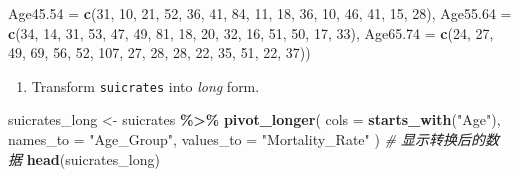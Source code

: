 \documentclass[
]{article}
\newenvironment{Shaded}{\begin{snugshade}}{\end{snugshade}}
\newcommand{\AttributeTok}[1]{\textcolor[rgb]{0.13,0.29,0.53}{#1}}
\newcommand{\CommentTok}[1]{\textcolor[rgb]{0.56,0.35,0.01}{\textit{#1}}}
\newcommand{\DecValTok}[1]{\textcolor[rgb]{0.00,0.00,0.81}{#1}}
\newcommand{\FunctionTok}[1]{\textcolor[rgb]{0.13,0.29,0.53}{\textbf{#1}}}
\newcommand{\NormalTok}[1]{#1}
\newcommand{\OtherTok}[1]{\textcolor[rgb]{0.56,0.35,0.01}{#1}}
\newcommand{\SpecialCharTok}[1]{\textcolor[rgb]{0.81,0.36,0.00}{\textbf{#1}}}
\newcommand{\StringTok}[1]{\textcolor[rgb]{0.31,0.60,0.02}{#1}}
\providecommand{\tightlist}{%
  \setlength{\itemsep}{0pt}\setlength{\parskip}{0pt}}
\begin{document}
\begin{Shaded}
\begin{Highlighting}[]
\AttributeTok{Age45.54 =} \FunctionTok{c}\NormalTok{(}\DecValTok{31}\NormalTok{, }\DecValTok{10}\NormalTok{, }\DecValTok{21}\NormalTok{, }\DecValTok{52}\NormalTok{, }\DecValTok{36}\NormalTok{, }\DecValTok{41}\NormalTok{, }\DecValTok{84}\NormalTok{, }\DecValTok{11}\NormalTok{, }\DecValTok{18}\NormalTok{, }\DecValTok{36}\NormalTok{, }\DecValTok{10}\NormalTok{, }\DecValTok{46}\NormalTok{, }\DecValTok{41}\NormalTok{, }\DecValTok{15}\NormalTok{, }\DecValTok{28}\NormalTok{), }
\AttributeTok{Age55.64 =} \FunctionTok{c}\NormalTok{(}\DecValTok{34}\NormalTok{, }\DecValTok{14}\NormalTok{, }\DecValTok{31}\NormalTok{, }\DecValTok{53}\NormalTok{, }\DecValTok{47}\NormalTok{, }\DecValTok{49}\NormalTok{, }\DecValTok{81}\NormalTok{, }\DecValTok{18}\NormalTok{, }\DecValTok{20}\NormalTok{, }\DecValTok{32}\NormalTok{, }\DecValTok{16}\NormalTok{, }\DecValTok{51}\NormalTok{, }\DecValTok{50}\NormalTok{, }\DecValTok{17}\NormalTok{, }\DecValTok{33}\NormalTok{), }
\AttributeTok{Age65.74 =} \FunctionTok{c}\NormalTok{(}\DecValTok{24}\NormalTok{, }\DecValTok{27}\NormalTok{, }\DecValTok{49}\NormalTok{, }\DecValTok{69}\NormalTok{, }\DecValTok{56}\NormalTok{, }\DecValTok{52}\NormalTok{, }\DecValTok{107}\NormalTok{, }\DecValTok{27}\NormalTok{, }\DecValTok{28}\NormalTok{, }\DecValTok{28}\NormalTok{, }\DecValTok{22}\NormalTok{, }\DecValTok{35}\NormalTok{, }\DecValTok{51}\NormalTok{, }\DecValTok{22}\NormalTok{, }\DecValTok{37}\NormalTok{))}
\end{Highlighting}
\end{Shaded}

\begin{enumerate}
\def\labelenumi{\alph{enumi}.}
\tightlist
\item
  Transform \texttt{suicrates} into \emph{long} form.
\end{enumerate}

\begin{Shaded}
\begin{Highlighting}[]
\NormalTok{suicrates\_long }\OtherTok{\textless{}{-}}\NormalTok{ suicrates }\SpecialCharTok{\%\textgreater{}\%}
\FunctionTok{pivot\_longer}\NormalTok{(}
\AttributeTok{cols =} \FunctionTok{starts\_with}\NormalTok{(}\StringTok{"Age"}\NormalTok{),}
\AttributeTok{names\_to =} \StringTok{"Age\_Group"}\NormalTok{,}
\AttributeTok{values\_to =} \StringTok{"Mortality\_Rate"}
\NormalTok{)}
\CommentTok{\# 显示转换后的数据}
\FunctionTok{head}\NormalTok{(suicrates\_long)}
\end{Highlighting}
\end{Shaded}
\end{document}
